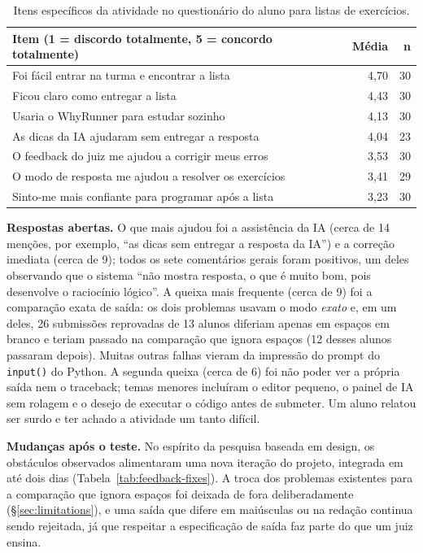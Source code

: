 \documentclass[12pt]{article}
\begin{document}
\begin{table}[ht]
\centering
\footnotesize
\caption{Itens específicos da atividade no questionário do aluno para listas de exercícios.}
\label{tab:survey-items}
\begin{tabular}{lrr}
\hline
\textbf{Item (1 = discordo totalmente, 5 = concordo totalmente)} & \textbf{Média} & \textbf{n} \\
\hline
Foi fácil entrar na turma e encontrar a lista             & 4,70 & 30 \\
Ficou claro como entregar a lista                         & 4,43 & 30 \\
Usaria o WhyRunner para estudar sozinho                   & 4,13 & 30 \\
As dicas da IA ajudaram sem entregar a resposta           & 4,04 & 23 \\
O feedback do juiz me ajudou a corrigir meus erros        & 3,53 & 30 \\
O modo de resposta me ajudou a resolver os exercícios     & 3,41 & 29 \\
Sinto-me mais confiante para programar após a lista       & 3,23 & 30 \\
\hline
\end{tabular}
\end{table}

\textbf{Respostas abertas.} O que mais ajudou foi a assistência da IA (cerca de 14 menções, por exemplo, ``as dicas sem entregar a resposta da IA'') e a correção imediata (cerca de 9); todos os sete comentários gerais foram positivos, um deles observando que o sistema ``não mostra resposta, o que é muito bom, pois desenvolve o raciocínio lógico''. A queixa mais frequente (cerca de 9) foi a comparação exata de saída: os dois problemas usavam o modo \emph{exato} e, em um deles, 26 submissões reprovadas de 13 alunos diferiam apenas em espaços em branco e teriam passado na comparação que ignora espaços (12 desses alunos passaram depois). Muitas outras falhas vieram da impressão do prompt do \texttt{input()} do Python. A segunda queixa (cerca de 6) foi não poder ver a própria saída nem o traceback; temas menores incluíram o editor pequeno, o painel de IA sem rolagem e o desejo de executar o código antes de submeter. Um aluno relatou ser surdo e ter achado a atividade um tanto difícil.

\textbf{Mudanças após o teste.} No espírito da pesquisa baseada em design, os obstáculos observados alimentaram uma nova iteração do projeto, integrada em até dois dias (Tabela~\ref{tab:feedback-fixes}). A troca dos problemas existentes para a comparação que ignora espaços foi deixada de fora deliberadamente (\S\ref{sec:limitations}), e uma saída que difere em maiúsculas ou na redação continua sendo rejeitada, já que respeitar a especificação de saída faz parte do que um juiz ensina.
\end{document}

